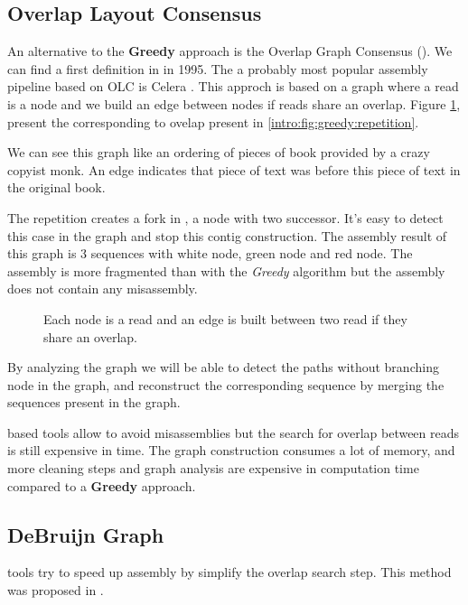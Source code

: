 \documentclass[./main.tex]{subfiles}
\begin{document}
\subsection{Overlap Layout Consensus} \label{intro:subsec:OLC}

An alternative to the \textbf{Greedy} approach is the Overlap Graph Consensus (\OLC). We can find a first \OLC definition in \cite{OLC_myers} in 1995. The a probably most popular assembly pipeline based on OLC is Celera \cite{celera_first, celera_second}. This approch is based on a graph where a read is a node and we build an edge between nodes if reads share an overlap. Figure \ref{intro:fig:olc:graph}, present the \OLC corresponding to ovelap present in \ref{intro:fig:greedy:repetition}.

We can see this graph like an ordering of pieces of book provided by a crazy copyist monk. An edge indicates that piece of text was before this piece of text in the original book.

The repetition creates a fork in \OLC, a node with two successor. It's easy to detect this case in the graph and stop this contig construction. The assembly result of this graph is 3 sequences with white node, green node and red node. The assembly is more fragmented than with the \textit{Greedy} algorithm but the assembly does not contain any misassembly.

\begin{figure}[ht]
    \centering 
    
    \caption{Each node is a read and an edge is built between two read if they share an overlap.}
    \label{intro:fig:olc:graph}
\end{figure}

By analyzing the graph we will be able to detect the paths without branching node in the graph, and reconstruct the corresponding sequence by merging the sequences present in the graph.

\OLC based tools allow to avoid misassemblies but the search for overlap between reads is still expensive in time. The graph construction consumes a lot of memory, and more cleaning steps and graph analysis are expensive in computation time compared to a \textbf{Greedy} approach. 

\subsection{DeBruijn Graph}

\DBG tools try to speed up assembly by simplify the overlap search step. This method was proposed in  \cite{eulerian_approach}.
\end{document}
